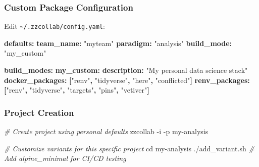\documentclass[
]{article}
\newenvironment{Shaded}{\begin{snugshade}}{\end{snugshade}}
\newcommand{\AttributeTok}[1]{\textcolor[rgb]{0.13,0.29,0.53}{#1}}
\newcommand{\BuiltInTok}[1]{#1}
\newcommand{\CommentTok}[1]{\textcolor[rgb]{0.56,0.35,0.01}{\textit{#1}}}
\newcommand{\ExtensionTok}[1]{#1}
\newcommand{\FunctionTok}[1]{\textcolor[rgb]{0.13,0.29,0.53}{\textbf{#1}}}
\newcommand{\KeywordTok}[1]{\textcolor[rgb]{0.13,0.29,0.53}{\textbf{#1}}}
\newcommand{\NormalTok}[1]{#1}
\newcommand{\StringTok}[1]{\textcolor[rgb]{0.31,0.60,0.02}{#1}}
\begin{document}
\subsubsection{Custom Package
Configuration}\label{custom-package-configuration}

Edit \texttt{\textasciitilde{}/.zzcollab/config.yaml}:

\begin{Shaded}
\begin{Highlighting}[]
\FunctionTok{defaults}\KeywordTok{:}
\AttributeTok{  }\FunctionTok{team\_name}\KeywordTok{:}\AttributeTok{ }\StringTok{"myteam"}
\AttributeTok{  }\FunctionTok{paradigm}\KeywordTok{:}\AttributeTok{ }\StringTok{"analysis"}
\AttributeTok{  }\FunctionTok{build\_mode}\KeywordTok{:}\AttributeTok{ }\StringTok{"my\_custom"}

\FunctionTok{build\_modes}\KeywordTok{:}
\AttributeTok{  }\FunctionTok{my\_custom}\KeywordTok{:}
\AttributeTok{    }\FunctionTok{description}\KeywordTok{:}\AttributeTok{ }\StringTok{"My personal data science stack"}
\AttributeTok{    }\FunctionTok{docker\_packages}\KeywordTok{:}\AttributeTok{ }\KeywordTok{[}\StringTok{"renv"}\KeywordTok{,}\AttributeTok{ }\StringTok{"tidyverse"}\KeywordTok{,}\AttributeTok{ }\StringTok{"here"}\KeywordTok{,}\AttributeTok{ }\StringTok{"conflicted"}\KeywordTok{]}
\AttributeTok{    }\FunctionTok{renv\_packages}\KeywordTok{:}\AttributeTok{ }\KeywordTok{[}\StringTok{"renv"}\KeywordTok{,}\AttributeTok{ }\StringTok{"tidyverse"}\KeywordTok{,}\AttributeTok{ }\StringTok{"targets"}\KeywordTok{,}\AttributeTok{ }\StringTok{"pins"}\KeywordTok{,}\AttributeTok{ }\StringTok{"vetiver"}\KeywordTok{]}
\end{Highlighting}
\end{Shaded}

\subsubsection{Project Creation}\label{project-creation}

\begin{Shaded}
\begin{Highlighting}[]
\CommentTok{\# Create project using personal defaults}
\ExtensionTok{zzcollab} \AttributeTok{{-}i} \AttributeTok{{-}p}\NormalTok{ my{-}analysis}

\CommentTok{\# Customize variants for this specific project}
\BuiltInTok{cd}\NormalTok{ my{-}analysis}
\ExtensionTok{./add\_variant.sh}    \CommentTok{\# Add alpine\_minimal for CI/CD testing}
\end{Highlighting}
\end{Shaded}
\end{document}

